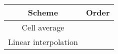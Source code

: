 \begin{tabular}{cc}
\toprule
Scheme & Order  \\
\midrule
Cell average &  \\	
Linear interpolation & \\
\bottomrule
\end{tabular}
